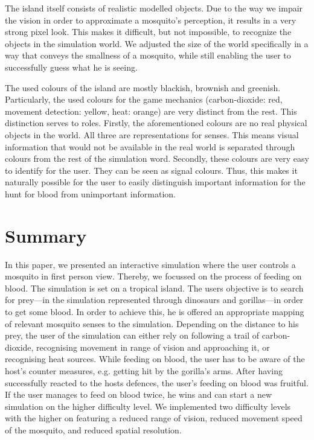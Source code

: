 \documentclass{sig-alternate-05-2015}
\begin{document}
The island itself consists of realistic modelled objects. Due to the way we impair the vision in order to approximate a mosquito's perception, it results in a very strong pixel look. This makes it difficult, but not impossible, to recognize the objects in the simulation world. We adjusted the size of the world specifically in a way that conveys the smallness of a mosquito, while still enabling the user to successfully guess what he is seeing.

The used colours of the island are mostly blackish, brownish and greenish. Particularly, the used colours for the game mechanics (carbon-dioxide: red, movement detection: yellow, heat: orange) are very distinct from the rest. This distinction serves to roles. Firstly, the aforementioned colours are no real physical objects in the world. All three are representations for senses. This means visual information that would not be available in the real world is separated through colours from the rest of the simulation word. Secondly, these colours are very easy to identify for the user. They can be seen as signal colours. Thus, this makes it naturally possible for the user to easily distinguish important information for the hunt for blood from unimportant information. 


\section{Summary}
\label{sec:summary}
\noindent
In this paper, we presented an interactive simulation where the user controls a mosquito in first person view. Thereby, we focussed on the process of feeding on blood. The simulation is set on a tropical island. The users objective is to search for prey---in the simulation represented through dinosaurs and gorillas---in order to get some blood. In order to achieve this, he is offered an appropriate mapping of relevant mosquito senses to the simulation. Depending on the distance to his prey, the user of the simulation can either rely on following a trail of carbon-dioxide, recognising movement in range of vision and approaching it, or recognising heat sources. While feeding on blood, the user has to be aware of the host's counter measures, e.g. getting hit by the gorilla's arms. After having successfully reacted to the hosts defences, the user's feeding on blood was fruitful. If the user manages to feed on blood twice, he wins and can start a new simulation on the higher difficulty level. We implemented two difficulty levels with the higher on featuring a reduced range of vision, reduced movement speed of the mosquito, and reduced spatial resolution.
\end{document}
